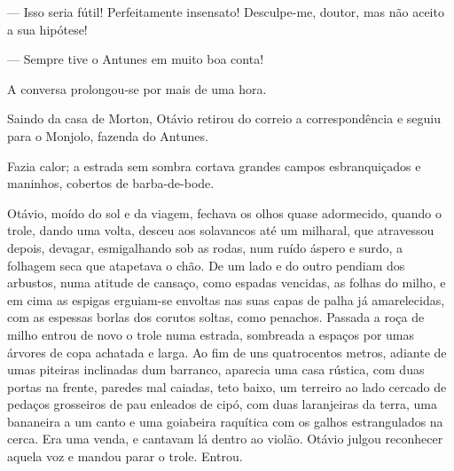{--- Isso seria fútil! Perfeitamente insensato! Desculpe-me,
doutor, mas não aceito a sua hipótese!



--- Sempre tive o Antunes em muito boa conta!




A conversa prolongou-se por mais de uma hora.

Saindo da casa de Morton, Otávio retirou do correio a
correspondência e seguiu para o Monjolo, fazenda do Antunes.

Fazia calor; a estrada sem sombra cortava grandes campos
esbranquiçados e maninhos, cobertos de barba-de-bode.

Otávio, moído do sol e da viagem, fechava os olhos
quase adormecido, quando o trole, dando uma volta,
desceu aos solavancos até um milharal, que atravessou depois, devagar,
esmigalhando sob as rodas, num ruído áspero e surdo, a folhagem
seca que atapetava o chão. De um lado e do outro pendiam dos
arbustos, numa atitude de cansaço, como espadas vencidas, as
folhas do milho, e em cima as espigas erguiam-se envoltas nas suas capas
de palha já amarelecidas, com as espessas borlas dos corutos soltas,
como penachos. Passada a roça de milho entrou de novo o trole
numa estrada, sombreada a espaços por umas árvores de copa achatada e
larga. Ao fim de uns quatrocentos metros, adiante de umas piteiras
inclinadas dum barranco, aparecia uma casa rústica, com duas portas na
frente, paredes mal caiadas, teto baixo, um terreiro ao lado cercado de
pedaços grosseiros de pau enleados de cipó, com duas laranjeiras da
terra, uma bananeira a um canto e uma goiabeira raquítica com os galhos
estrangulados na cerca. Era uma venda, e cantavam lá dentro ao
violão. Otávio julgou reconhecer aquela voz e mandou parar o
trole. Entrou.

}
